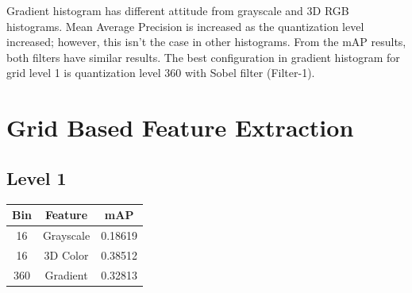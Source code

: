 \documentclass[12pt]{article}
\begin{document}
\qquad Gradient histogram has different attitude from grayscale and 3D RGB histograms. Mean Average Precision is increased as the quantization level increased; however, this isn't the case in other histograms. From the mAP results, both filters have similar results. The best configuration in gradient histogram for grid level 1 is quantization level 360 with Sobel filter (Filter-1).

\section{Grid Based Feature Extraction}
\subsection{Level 1}
\begin{minipage}{\textwidth}
	\begin{minipage}{0.49\textwidth}
		\centering
		\captionsetup{width=.9\textwidth}
	 \end{minipage}
	 \hfill
	\begin{minipage}{0.49\textwidth}
		\centering
		\begin{tabular}{ | c | c | c | }
		  	\hline			
		  	\bf Bin & \bf Feature & \bf mAP \\
		  	\hline			
		  	16 & Grayscale & 0.18619 \\
		  	\hline			
		  	16 & 3D Color & 0.38512 \\
		  	\hline			
		  	360 & Gradient & 0.32813 \\
		  	\hline
		\end{tabular}
		\captionsetup{width=.8\textwidth}
	\end{minipage}
\end{minipage}
\end{document}
